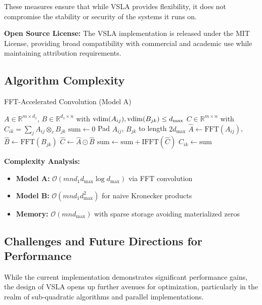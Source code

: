 These measures ensure that while VSLA provides flexibility, it does not compromise the stability or security of the systems it runs on.

\textbf{Open Source License:} The VSLA implementation is released under the MIT License, providing broad compatibility with commercial and academic use while maintaining attribution requirements.

\subsection{Algorithm Complexity}

\begin{algorithm}
\caption{FFT-Accelerated Convolution (Model A)}
{\small
\begin{algorithmic}[1]
\REQUIRE $A \in \mathbb{R}^{m \times d_1}$, $B \in \mathbb{R}^{d_1 \times n}$ with $\operatorname{vdim}(A_{ij}), \operatorname{vdim}(B_{jk}) \leq d_{\max}$
\ENSURE $C \in \mathbb{R}^{m \times n}$ with $C_{ik} = \sum_j A_{ij} \otimes_c B_{jk}$
        \STATE $\text{sum} \leftarrow 0$
            \STATE Pad $A_{ij}$, $B_{jk}$ to length $2d_{\max}$
            \STATE $\hat{A} \leftarrow \text{FFT}(A_{ij})$, $\hat{B} \leftarrow \text{FFT}(B_{jk})$ 
            \STATE $\hat{C} \leftarrow \hat{A} \odot \hat{B}$ 
            \STATE $\text{sum} \leftarrow \text{sum} + \text{IFFT}(\hat{C})$
        \ENDFOR
        \STATE $C_{ik} \leftarrow \text{sum}$
    \ENDFOR
\ENDFOR
\end{algorithmic}
}
\end{algorithm}

\textbf{Complexity Analysis:} 
\begin{itemize}[leftmargin=1.5em]
\item \textbf{Model A:} $\mathcal{O}(mn d_1 d_{\max} \log d_{\max})$ via FFT convolution
\item \textbf{Model B:} $\mathcal{O}(mn d_1 d_{\max}^2)$ for naive Kronecker products  
\item \textbf{Memory:} $\mathcal{O}(mn d_{\max})$ with sparse storage avoiding materialized zeros
\end{itemize}

\subsection{Challenges and Future Directions for Performance}
While the current implementation demonstrates significant performance gains, the design of VSLA opens up further avenues for optimization, particularly in the realm of sub-quadratic algorithms and parallel implementations.

